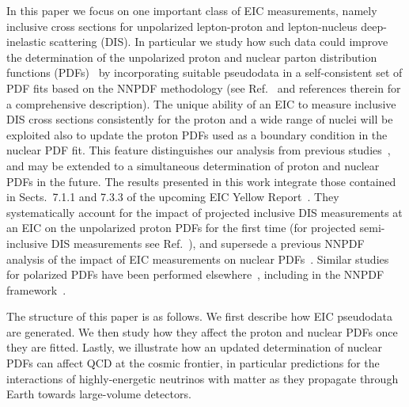 \documentclass[11pt,a4paper]{article}
\begin{document}
In this paper we focus on one important class of EIC measurements, namely
inclusive cross sections for unpolarized lepton-proton and lepton-nucleus
deep-inelastic scattering (DIS). In particular we study how such data could
improve the determination of the unpolarized proton and nuclear parton
distribution functions (PDFs)~\cite{Ethier:2020way} by incorporating suitable
pseudodata in a self-consistent set of PDF fits based on the NNPDF methodology
(see Ref.~\cite{Ball:2014uwa} and references therein for a comprehensive
description). The unique ability of an EIC to measure inclusive DIS cross
sections consistently for the proton and a wide range of nuclei will be
exploited also to update the proton PDFs used as a boundary condition in the
nuclear PDF fit. This feature distinguishes our analysis from previous
studies~\cite{Aschenauer:2017oxs,AbdulKhalek:2019mzd}, and may be extended to a
simultaneous determination of proton and nuclear PDFs in the future. The
results presented in this work integrate those contained in Sects.~7.1.1 and
7.3.3 of the upcoming EIC Yellow Report~\cite{AbdulKhalek:2021gbh}. They systematically
account for the impact of projected inclusive DIS measurements at an EIC on the
unpolarized proton PDFs for the first time (for projected semi-inclusive DIS
measurements see Ref.~\cite{Aschenauer:2019kzf}), and supersede a previous
NNPDF analysis of the impact of EIC measurements on nuclear
PDFs~\cite{AbdulKhalek:2019mzd}. Similar studies for polarized PDFs have been
performed elsewhere~\cite{Aschenauer:2012ve,Aschenauer:2013iia,
  Aschenauer:2015ata,Aschenauer:2020pdk}, including in the NNPDF
framework~\cite{Ball:2013tyh}.

The structure of this paper is as follows. We first describe how EIC pseudodata
are generated. We then study how they affect the proton and nuclear PDFs once
they are fitted. Lastly, we illustrate how an updated determination of nuclear
PDFs can affect QCD at the cosmic frontier, in particular predictions for
the interactions of highly-energetic neutrinos with matter as they propagate
through Earth towards large-volume detectors.
\end{document}
